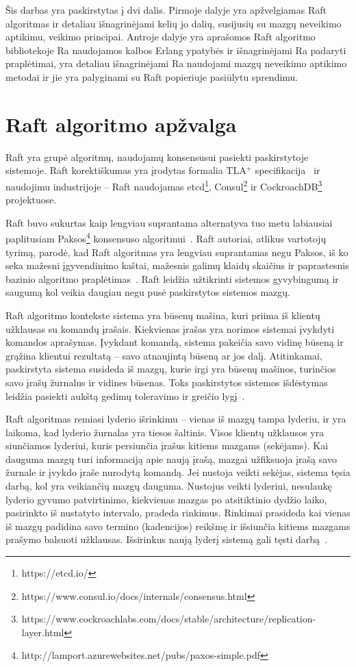 \documentclass{VUMIFPSkursinis}
\begin{document}
Šis darbas yra paskirstytas į dvi dalis. Pirmoje dalyje yra apžvelgiamas Raft algoritmas ir detaliau išnagrinėjami kelių jo dalių, susijusių su mazgų neveikimo aptikimu, veikimo principai. Antroje dalyje yra aprašomos Raft algoritmo bibliotekoje Ra naudojamos kalbos Erlang ypatybės ir išnagrinėjami Ra padaryti praplėtimai, yra detaliau išnagrinėjami Ra naudojami mazgų neveikimo aptikimo metodai ir jie yra palyginami su Raft popieriuje pasiūlytu sprendimu.

\section{Raft algoritmo apžvalga}

Raft yra grupė algoritmų, naudojamų konsensusui pasiekti paskirstytoje sistemoje. Raft korektiškumas yra įrodytas formalia TLA$^+$ specifikacija~\cite{ongaro_consensus} ir naudojimu industrijoje -- Raft naudojamas etcd\footnote{https://etcd.io/}, Consul\footnote{https://www.consul.io/docs/internals/consensus.html} ir CockroachDB\footnote{https://www.cockroachlabs.com/docs/stable/architecture/replication-layer.html} projektuose. 

Raft buvo sukurtas kaip lengviau suprantama alternatyva tuo metu labiausiai paplitusiam Paksos\footnote{http://lamport.azurewebsites.net/pubs/paxos-simple.pdf} konsensuso algoritmui~\cite{ongaro_consensus, diego_designing_2016}. Raft autoriai, atlikus vartotojų tyrimą, parodė, kad Raft algoritmas yra lengviau suprantamas negu Paksos, iš ko seka mažesni įgyvendinimo kaštai, mažesnis galimų klaidų skaičius ir paprastesnis bazinio algoritmo praplėtimas~\cite{ongaro_consensus}. Raft leidžia užtikrinti sistemos gyvybingumą ir saugumą kol veikia daugiau negu pusė paskirstytos sistemos mazgų. 

Raft algoritmo kontekste sistema yra būsenų mašina, kuri priima iš klientų užklausas su komandų įrašais. Kiekvienas įrašas yra norimos sistemai įvykdyti komandos aprašymas. Įvykdant komandą, sistema pakeičia savo vidinę būseną ir grąžina klientui rezultatą -- savo atnaujintą būseną ar jos dalį. Atitinkamai, paskirstyta sistema susideda iš mazgų, kurie irgi yra būsenų mašinos, turinčios savo įrašų žurnalus ir vidines būsenas. Toks paskirstytos sistemos išdėstymas leidžia pasiekti aukštą gedimų toleravimo ir greičio lygį~\cite{ongaro_consensus, steen_distributed_2017}.

Raft algoritmas remiasi lyderio išrinkimu -- vienas iš mazgų tampa lyderiu, ir yra laikoma, kad lyderio žurnalas yra tiesos šaltinis. Visos klientų užklausos yra siunčiamos lyderiui, kuris persiunčia įrašus kitiems mazgams (sekėjams). Kai dauguma mazgų turi informaciją apie naują įrašą, mazgai užfiksuoja įrašą savo žurnale ir įvykdo įraše nurodytą komandą. Jei nustoja veikti sekėjas, sistema tęsia darbą, kol yra veikiančių mazgų dauguma. Nustojus veikti lyderiui, nesulaukę lyderio gyvumo patvirtinimo, kiekvienas mazgas po atsitiktinio dydžio laiko, pasirinkto iš nustatyto intervalo,  pradeda rinkimus. Rinkimai prasideda kai vienas iš mazgų padidina savo termino (kadencijos) reikšmę ir išsiunčia kitiems mazgams prašymo balsuoti užklausas. Išsirinkus naują lyderį sistemą gali tęsti darbą~\cite{ongaro_consensus}. 
\end{document}
